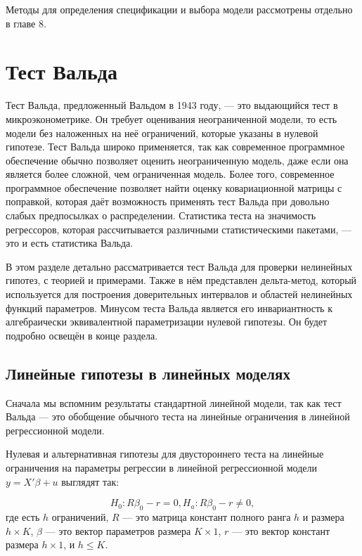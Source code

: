 Методы для определения спецификации и выбора модели рассмотрены отдельно в главе 8.

\section{Тест Вальда}

Тест Вальда, предложенный Вальдом в 1943 году, --- это выдающийся тест в микроэконометрике. Он требует оценивания неограниченной модели, то есть модели без наложенных на неё ограничений, которые указаны в нулевой гипотезе. Тест Вальда широко применяется, так как современное программное обеспечение обычно позволяет оценить неограниченную модель, даже если она является более сложной, чем ограниченная модель. Более того, современное программное обеспечение позволяет найти оценку ковариационной матрицы с поправкой, которая даёт возможность применять тест Вальда при довольно слабых предпосылках о распределении. Статистика теста на значимость регрессоров, которая рассчитывается различными статистическими пакетами, --- это и есть статистика Вальда. 

В этом разделе детально рассматривается тест Вальда для проверки нелинейных гипотез, с теорией и примерами. Также в нём представлен дельта-метод, который используется для построения доверительных интервалов и областей нелинейных функций параметров. Минусом теста Вальда является его инвариантность к алгебраически эквивалентной параметризации нулевой гипотезы. Он будет подробно освещён в конце раздела.

\subsection{Линейные гипотезы в линейных моделях}

Сначала мы вспомним результаты стандартной линейной модели, так как тест Вальда --- это обобщение обычного теста на линейные ограничения в линейной регрессионной модели.

Нулевая и альтернативная гипотезы для двустороннего теста на линейные ограничения на параметры регрессии в линейной регрессионной модели $y = X'\beta + u$ выглядят так:

\begin{equation}
H_0: R\beta_0 - r = 0,
H_a: R\beta_0 - r \not= 0,
\end{equation}
где есть $h$ ограничений, $R$ --- это матрица констант полного ранга $h$ и размера $h \times K$, $\beta$ --- это вектор параметров размера $K \times 1$, $r$ --- это вектор констант размера $h \times 1$, и $h \leq K$.

